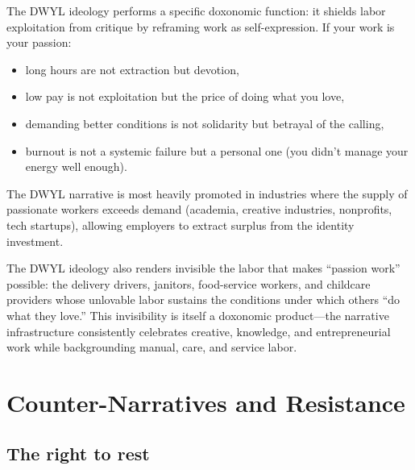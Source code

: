 \begin{proposition}
\label{prop:dwyl}
The DWYL ideology performs a specific doxonomic function: it shields labor exploitation from critique by reframing work as self-expression.
If your work is your passion:
\begin{itemize}[nosep]
  \item long hours are not extraction but devotion,
  \item low pay is not exploitation but the price of doing what you love,
  \item demanding better conditions is not solidarity but betrayal of the calling,
  \item burnout is not a systemic failure but a personal one (you didn't manage your energy well enough).
\end{itemize}
The DWYL narrative is most heavily promoted in industries where the supply of passionate workers exceeds demand (academia, creative industries, nonprofits, tech startups), allowing employers to extract surplus from the identity investment.
\end{proposition}

The DWYL ideology also renders invisible the labor that makes ``passion work'' possible: the delivery drivers, janitors, food-service workers, and childcare providers whose unlovable labor sustains the conditions under which others ``do what they love.''
This invisibility is itself a doxonomic product---the narrative infrastructure consistently celebrates creative, knowledge, and entrepreneurial work while backgrounding manual, care, and service labor.

\section{Counter-Narratives and Resistance}
\label{sec:ch26-counter}

\subsection{The right to rest}

